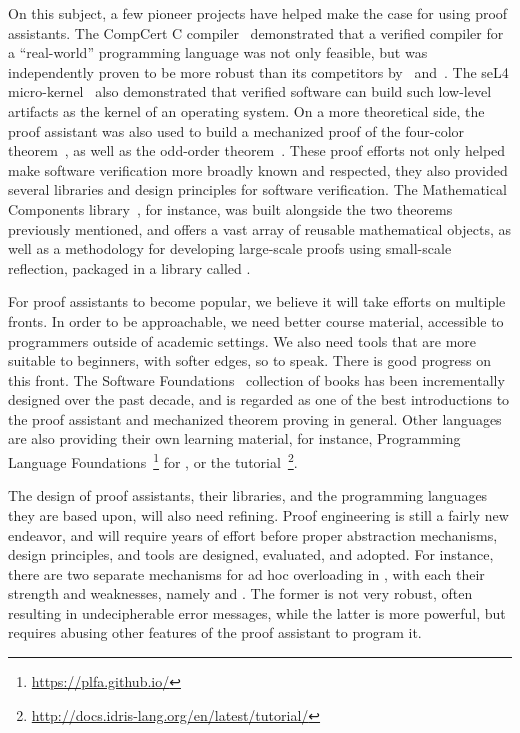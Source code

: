 On this subject, a few pioneer projects have helped make the case for using
proof assistants.  The CompCert C compiler~
demonstrated that a verified compiler for a ``real-world'' programming language
was not only feasible, but was independently proven to be more robust than its
competitors by~ and~.  The seL4
micro-kernel~ also demonstrated that verified software can
build such low-level artifacts as the kernel of an operating system.  On a more
theoretical side, the \Coq{} proof assistant was also used to build a mechanized
proof of the four-color theorem~, as well as the
odd-order theorem~.  These proof efforts not only
helped make software verification more broadly known and respected, they also
provided several libraries and design principles for software verification.  The
Mathematical Components library~, for instance,
was built alongside the two theorems previously mentioned, and offers a vast
array of reusable mathematical objects, as well as a methodology for developing
large-scale proofs using small-scale reflection, packaged in a library called
.

For proof assistants to become popular, we believe it will take efforts on
multiple fronts.  In order to be approachable, we need better course material,
accessible to programmers outside of academic settings.  We also need tools that
are more suitable to beginners, with softer edges, so to speak.  There is good
progress on this front.  The Software Foundations~
collection of books has been incrementally designed over the past decade, and is
regarded as one of the best introductions to the \Coq{} proof assistant and
mechanized theorem proving in general.  Other languages are also providing their
own learning material, for instance, Programming Language
Foundations~\footnote{\url{https://plfa.github.io/}} for \Agda{}, or the
\Idris{}
tutorial~\footnote{\url{http://docs.idris-lang.org/en/latest/tutorial/}}.

The design of proof assistants, their libraries, and the programming languages
they are based upon, will also need refining.  Proof engineering is still a
fairly new endeavor, and will require years of effort before proper abstraction
mechanisms, design principles, and tools are designed, evaluated, and adopted.
For instance, there are two separate mechanisms for ad hoc overloading in
\Coq{}, with each their strength and weaknesses, namely 
and .  The former is not very robust, often
resulting in undecipherable error messages, while the latter is more powerful,
but requires abusing other features of the proof assistant to program it.

